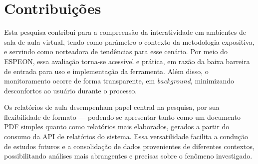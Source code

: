 \section{Contribuições}

Esta pesquisa contribui para a compreensão da interatividade em ambientes de sala de aula virtual, tendo como parâmetro o contexto da metodologia expositiva, e servindo como norteadora de tendências para esse cenário. Por meio do ESPEON, essa avaliação torna-se acessível e prática, em razão da baixa barreira de entrada para uso e implementação da ferramenta. Além disso, o monitoramento ocorre de forma transparente, em \textit{background}, minimizando desconfortos ao usuário durante o processo. 

Os relatórios de aula desempenham papel central na pesquisa, por sua flexibilidade de formato — podendo se apresentar tanto como um documento PDF simples quanto como relatórios mais elaborados, gerados a partir do consumo da API de relatórios do sistema. Essa versatilidade facilita a condução de estudos futuros e a consolidação de dados provenientes de diferentes contextos, possibilitando análises mais abrangentes e precisas sobre o fenômeno investigado.
